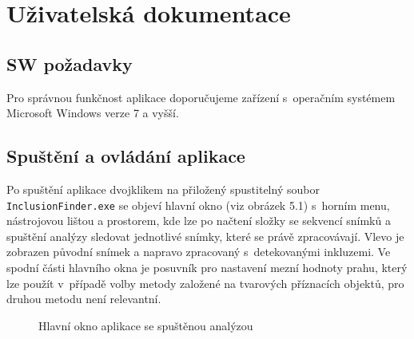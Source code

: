 \documentclass[12pt, a4paper]{report}
\begin{document}
\chapter{Uživatelská dokumentace}
	\section{SW požadavky}
	Pro správnou funkčnost aplikace doporučujeme zařízení s~operačním systémem Microsoft Windows verze 7 a vyšší.
	
	\section{Spuštění a ovládání aplikace}	
Po spuštění aplikace dvojklikem na přiložený spustitelný soubor\\ \texttt{InclusionFinder.exe} se objeví hlavní okno (viz obrázek 5.1) s~horním menu, nástrojovou lištou a prostorem, kde lze po načtení složky se sekvencí snímků a spuštění analýzy sledovat jednotlivé snímky, které se právě zpracovávají. Vlevo je zobrazen původní snímek a napravo zpracovaný s~detekovanými inkluzemi. Ve spodní části hlavního okna je posuvník pro nastavení mezní hodnoty prahu, který lze použít v~případě volby metody založené na tvarových příznacích objektů, pro druhou metodu není relevantní.

	\begin{figure}[!htb]
	\centering
	\label{fig:hlavni_okno}
	\caption{Hlavní okno aplikace se spuštěnou analýzou}
	\end{figure}
\end{document}
